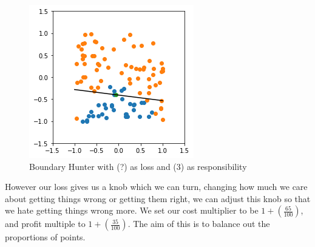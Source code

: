 \documentclass{article}
\begin{document}
\begin{figure}[H]
\centering
  \begin{minipage}[b]{0.4\textwidth}
    \includegraphics[width=\textwidth]{BoundaryHunter-Attempt4-01.png}
    \caption{Boundary Hunter with (?) as loss and (3) as responsibility}
  \end{minipage}
  \hfill
\end{figure}

However our loss gives us a knob which we can turn, changing how much we care about getting things wrong or getting them right, we can adjust this knob so that we hate getting things wrong more. We set our cost multiplier to be $1 + (\frac{65}{100})$, and profit multiple to  $1 + (\frac{35}{100})$. The aim of this is to balance out the proportions of points.
\end{document}
